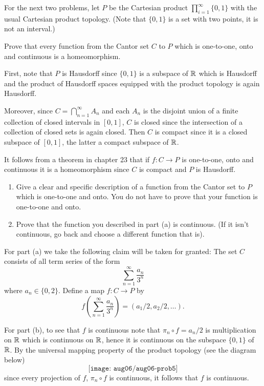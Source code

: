 For the next two problems, let \(P\) be the Cartesian product
\(\prod_{i=1}^\infty\{0,1\}\) with the usual Cartesian product
topology. (Note that \(\{0,1\}\) is a set with two points, it is not an
interval.)
\begin{problem}
  Prove that every function from the Cantor set \(C\) to \(P\) which is
  one-to-one, onto and continuous is a homeomorphism.
\end{problem}
\begin{solution}
  First, note that \(P\) is Hausdorff since \(\{0,1\}\) is a subspace of
  \(\mathbb{R}\) which is Hausdorff and the product of Hausdorff spaces equipped
  with the product topology is again Hausdorff.

  Moreover, since \(C=\bigcap_{n=1}^\infty A_n\) and each \(A_n\) is the
  disjoint union of a finite collection of closed intervals in \([0,1]\),
  \(C\) is closed since the intersection of a collection of closed sets is
  again closed. Then \(C\) is compact since it is a closed subspace of
  \([0,1]\), the latter a compact subspace of \(\mathbb{R}\).

  It follows from a theorem in chapter 23 that if \(f\colon C\to P\) is
  one-to-one, onto and continuous it is a homeomorphism since \(C\) is
  compact and \(P\) is Hausdorff.
\end{solution}

\begin{problem}
  \hfill
  \begin{enumerate}[label=(\alph*)]
  \item Give a clear and specific description of a function from the Cantor
    set to \(P\) which is one-to-one and onto. You do not have to prove
    that your function is one-to-one and onto.
  \item Prove that the function you described in part (a) is
    continuous. (If it isn't continuous, go back and choose a different
    function that is).
  \end{enumerate}
\end{problem}
\begin{solution}
  For part (a) we take the following claim will be taken for granted: The
  set \(C\) consists of all term series of the form
  \[
    \sum_{n=1}^\infty\frac{a_n}{3^n}
  \]
  where \(a_n\in\{0,2\}\). Define a map \(f\colon C\to P\) by
  \[
    f\left(\sum_{n=1}^\infty\frac{a_n}{3^n}\right)=(a_1/2,a_2/2,\ldots).
  \]

  For part (b), to see that \(f\) is continuous note that
  \(\pi_n\circ f=a_n/2\) is multiplication on \(\mathbb{R}\) which is continuous
  on \(\mathbb{R}\), hence it is continuous on the subspace \(\{0,1\}\) of
  \(\mathbb{R}\). By the universal mapping property of the product topology (see
  the diagram below)
  \[
    \texttt{[image: aug06/aug06-prob5]}
  \]
  since every projection of \(f\), \(\pi_n\circ f\) is continuous, it
  follows that \(f\) is continuous.
\end{solution}

